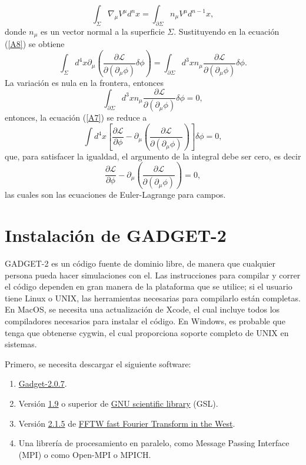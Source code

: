 \documentclass[a4paper,openright,10pt, oneside, final]{book}
\begin{document}
\begin{equation}
\int_{\Sigma}\nabla_{\mu}V^{\mu}d^{n}x = \int_{\partial\Sigma}n_{\mu}V^{\mu}d^{n-1}x,\label{A9}
\end{equation}
donde $n_{\mu}$ es un vector normal a la superficie $\Sigma$. Sustituyendo en la ecuación (\ref{A8}) se obtiene
\begin{equation}
\int_{\Sigma} d^{4}x\partial_{\mu}\left(\frac{\partial\mathcal{L}}{\partial(\partial_{\mu}\phi)}\delta\phi\right)
=
\int_{\partial\Sigma}d^{3}xn_{\mu}\frac{\partial\mathcal{L}}{\partial(\partial_{\mu}\phi)}\delta\phi.\label{A10}
\end{equation}
La variación es nula en la frontera, entonces
\begin{equation}
\int_{\partial\Sigma}d^{3}xn_{\mu}\frac{\partial\mathcal{L}}{\partial(\partial_{\mu}\phi)}\delta\phi = 0,\label{A11}
\end{equation}
entonces, la ecuación (\ref{A7}) se reduce a
\begin{equation}
\int d^{4}x \left[\frac{\partial\mathcal{L}}{\partial\phi} -
\partial_{\mu}\left(\frac{\partial\mathcal{L}}{\partial(\partial_{\mu}\phi)}\right)\right]\delta\phi = 0,\label{A12}
\end{equation}
que, para satisfacer la igualdad, el argumento de la integral debe ser cero, es decir 
\begin{equation}
\frac{\partial\mathcal{L}}{\partial\phi} -
\partial_{\mu}\left(\frac{\partial\mathcal{L}}{\partial(\partial_{\mu}\phi)}\right) = 0,\label{A13}
\end{equation}
las cuales son las ecuaciones de Euler-Lagrange para campos.


\chapter{Instalación de GADGET-2}\label{Apend.B}
GADGET-2 es un código fuente de dominio libre, de manera que cualquier persona pueda hacer simulaciones con el. Las instrucciones para compilar y correr el código dependen en gran manera de la plataforma que se utilice; si el usuario tiene Linux o UNIX, las herramientas necesarias para compilarlo están completas. En MacOS, se necesita una actualización de \textsf{Xcode}, el cual incluye todos los compiladores necesarios para instalar el código. En Windows, es probable que tenga que obtenerse \textsf{cygwin}, el cual proporciona soporte completo de UNIX en sistemas.

Primero, se necesita descargar el siguiente software:
\begin{enumerate}
\item \underline{Gadget-2.0.7}.
\item Versión \underline{1.9} o superior de \underline{GNU scientific library} (GSL).
\item Versión \underline{2.1.5} de \underline{FFTW fast Fourier Transform in the West}.
\item Una librería de procesamiento en paralelo, como Message Passing Interface (MPI) o como \textsf{Open-MPI} o \textsf{MPICH}.
\end{enumerate}
\end{document}
